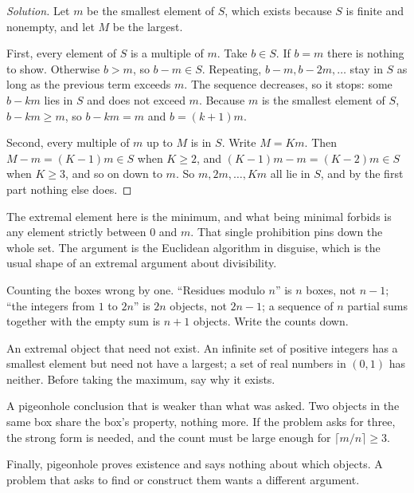 \begin{proof}[Solution]
Let $m$ be the smallest element of $S$, which exists because $S$ is finite and nonempty, and let $M$ be the largest.

First, every element of $S$ is a multiple of $m$. Take $b \in S$. If $b = m$ there is nothing to show. Otherwise $b > m$, so $b - m \in S$. Repeating, $b - m, b - 2m, \dots$ stay in $S$ as long as the previous term exceeds $m$. The sequence decreases, so it stops: some $b - km$ lies in $S$ and does not exceed $m$. Because $m$ is the smallest element of $S$, $b - km \ge m$, so $b - km = m$ and $b = (k+1) m$.

Second, every multiple of $m$ up to $M$ is in $S$. Write $M = Km$. Then $M - m = (K-1) m \in S$ when $K \ge 2$, and $(K-1)m - m = (K-2)m \in S$ when $K \ge 3$, and so on down to $m$. So $m, 2m, \dots, Km$ all lie in $S$, and by the first part nothing else does.
\end{proof}

The extremal element here is the minimum, and what being minimal forbids is any element strictly between $0$ and $m$. That single prohibition pins down the whole set. The argument is the Euclidean algorithm in disguise, which is the usual shape of an extremal argument about divisibility.

\begin{trap}
Counting the boxes wrong by one. ``Residues modulo $n$'' is $n$ boxes, not $n - 1$; ``the integers from $1$ to $2n$'' is $2n$ objects, not $2n - 1$; a sequence of $n$ partial sums together with the empty sum is $n + 1$ objects. Write the counts down.

An extremal object that need not exist. An infinite set of positive integers has a smallest element but need not have a largest; a set of real numbers in $(0, 1)$ has neither. Before taking the maximum, say why it exists.

A pigeonhole conclusion that is weaker than what was asked. Two objects in the same box share the box's property, nothing more. If the problem asks for three, the strong form is needed, and the count must be large enough for $\lceil m/n \rceil \ge 3$.

Finally, pigeonhole proves existence and says nothing about which objects. A problem that asks to find or construct them wants a different argument.
\end{trap}


